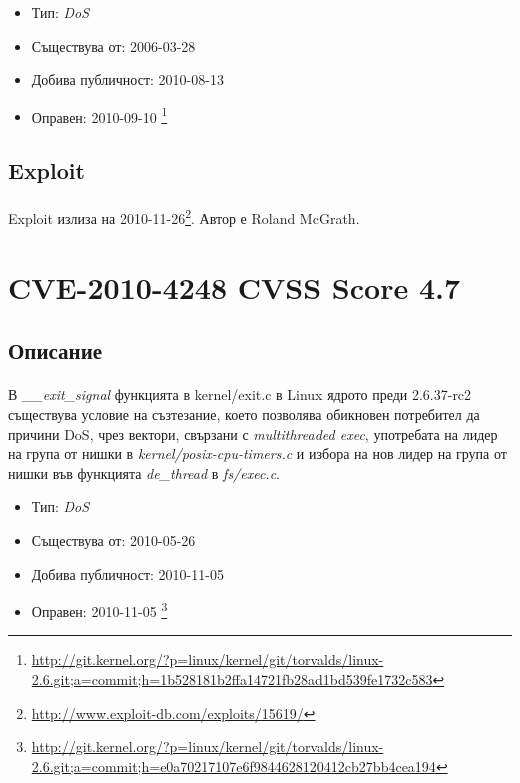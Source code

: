 \documentclass[a4paper,12pt,leqno]{article}
\begin{document}
\begin{itemize}
    \item Тип: \textit{DoS}
    \item Съществува от: 2006-03-28
  	\item Добива публичност: 2010-08-13
    \item Оправен: 2010-09-10 \footnote{\url{http://git.kernel.org/?p=linux/kernel/git/torvalds/linux-2.6.git;a=commit;h=1b528181b2ffa14721fb28ad1bd539fe1732c583}}
\end{itemize}

\subsection{Exploit}
\paragraph{}
Exploit излиза на 2010-11-26\footnote{\url{http://www.exploit-db.com/exploits/15619/}}. Автор е Roland McGrath.


\section{CVE-2010-4248 CVSS Score 4.7}
\subsection{Описание}
\paragraph{}
В \textit{\_\_exit\_signal} функцията в kernel/exit.c в Linux ядрото преди  2.6.37-rc2 съществува условие на съзтезание, което позволява обикновен потребител да причини DoS, чрез вектори, свързани с \textit{multithreaded exec}, употребата на лидер на група от нишки в \textit{kernel/posix-cpu-timers.c} и избора на нов лидер на група от нишки във функцията \textit{de\_thread} в \textit{fs/exec.c}.

\begin{itemize}
    \item Тип: \textit{DoS}
    \item Съществува от: 2010-05-26
  	\item Добива публичност: 2010-11-05
    \item Оправен: 2010-11-05 \footnote{\url{http://git.kernel.org/?p=linux/kernel/git/torvalds/linux-2.6.git;a=commit;h=e0a70217107e6f9844628120412cb27bb4cea194}}
\end{itemize}
\end{document}
